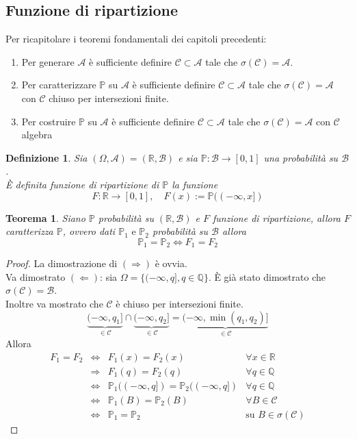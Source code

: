 \documentclass[a4paper,12pt]{article}
\theoremstyle{break}
\newtheorem{theorem}{Teorema}[section]
\newtheorem{definition}{Definizione}[section]
\numberwithin{equation}{section}
\begin{document}
\subsection{Funzione di ripartizione}
Per ricapitolare i teoremi fondamentali dei capitoli precedenti:
\begin{enumerate}
  \item Per generare \(\mathcal{A}\) è sufficiente definire \(\mathcal{C} \subset \mathcal{A}\) tale che \(\sigma(\mathcal{C}) = \mathcal{A}\). 
  \item Per caratterizzare \(\mathbb{P}\) su \(\mathcal{A}\) è sufficiente definire \(\mathcal{C} \subset \mathcal{A}\) tale che \(\sigma(\mathcal{C}) = \mathcal{A}\) con \(\mathcal{C}\) chiuso per intersezioni finite. 
  \item Per costruire \(\mathbb{P}\) su \(\mathcal{A}\) è sufficiente definire \(\mathcal{C} \subset \mathcal{A}\) tale che \(\sigma(\mathcal{C}) = \mathcal{A}\) con \(\mathcal{C}\) algebra
\end{enumerate}
\begin{definition}
  Sia \((\Omega, \mathcal{A}) = (\mathbb{R}, \mathcal{B})\) e sia \(\mathbb{P} : \mathcal{B} \to [0,1]\) una probabilità su \(\mathcal{B}\). \\
  È definita funzione di ripartizione di \(\mathbb{P}\) la funzione
  \[
    F : \mathbb{R} \to [0,1], \quad F(x) := \mathbb{P}((-\infty, x])
  \] 
\end{definition}
\begin{theorem}
  Siano \(\mathbb{P}\) probabilità su \((\mathbb{R}, \mathcal{B})\) e \(F\) funzione di ripartizione, allora \(F\) caratterizza \(\mathbb{P}\), ovvero dati \(\mathbb{P}_1 \mbox{ e } \mathbb{P}_2\) probabilità su \(\mathcal{B}\) allora
  \[
    \mathbb{P}_1 = \mathbb{P}_2 \Longleftrightarrow F_1 = F_2
  \]
\end{theorem}
\begin{proof}
  La dimostrazione di \((\Longrightarrow)\) è ovvia. \\
  Va dimostrato \((\Longleftarrow)\): sia \(\Omega = \{(-\infty, q], q \in \mathbb{Q}\}\). È già stato dimostrato che \(\sigma(\mathcal{C}) = \mathcal{B}\).\\
  Inoltre va mostrato che \(\mathcal{C}\) è chiuso per intersezioni finite. 
  \[
    \underbrace{(-\infty, q_1]}_{\in \mathcal{C}} \cap \underbrace{(-\infty, q_2]}_{\in \mathcal{C}} = \underbrace{(-\infty, \min(q_1, q_2)]}_{\in \mathcal{C}}
  \]
  Allora
  \[
    \begin{array}{llll}
      F_1 = F_2 & \Longleftrightarrow & F_1(x) = F_2(x) & \forall x \in \mathbb{R} \\
      & \Longrightarrow & F_1(q) = F_2(q) & \forall q \in \mathbb{Q} \\
      & \Longleftrightarrow & \mathbb{P}_1((-\infty, q]) = \mathbb{P}_2((-\infty, q]) & \forall q \in \mathbb{Q} \\
      & \Longleftrightarrow & \mathbb{P}_1(B) = \mathbb{P}_2(B) & \forall B \in \mathcal{C} \\
      & \Longleftrightarrow & \mathbb{P}_1 = \mathbb{P}_2 & \mbox{su } B \in \sigma(\mathcal{C})
    \end{array}
  \]
\end{proof}
\end{document}
